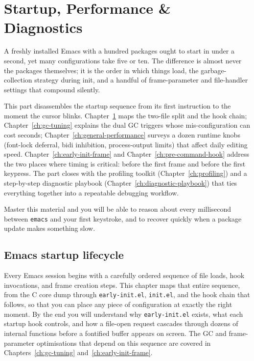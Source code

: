 \part{Startup, Performance \& Diagnostics}
\label{part:startup}

A freshly installed Emacs with a hundred packages ought to start in
under a second, yet many configurations take five or ten.  The
difference is almost never the packages themselves; it is the order
in which things load, the garbage-collection strategy during init,
and a handful of frame-parameter and file-handler settings that
compound silently.

This part disassembles the startup sequence from its first
instruction to the moment the cursor blinks.
Chapter~\ref{ch:startup-lifecycle} maps the two-file split and the
hook chain; Chapter~\ref{ch:gc-tuning} explains the dual GC triggers
whose mis-configuration can cost seconds;
Chapter~\ref{ch:general-performance} surveys a dozen runtime knobs
(font-lock deferral, bidi inhibition, process-output limits) that
affect daily editing speed.
Chapter~\ref{ch:early-init-frame} and
Chapter~\ref{ch:pre-command-hook} address the two places where timing
is critical: before the first frame and before the first keypress.
The part closes with the profiling toolkit
(Chapter~\ref{ch:profiling}) and a step-by-step diagnostic playbook
(Chapter~\ref{ch:diagnostic-playbook}) that ties everything together
into a repeatable debugging workflow.

Master this material and you will be able to reason about every
millisecond between \texttt{emacs} and your first keystroke, and to
recover quickly when a package update makes something slow.

\chapter{Emacs startup lifecycle}
\label{ch:startup-lifecycle}
\minitoc\label{emacs-startup-lifecycle}

Every Emacs session begins with a carefully ordered sequence of file
loads, hook invocations, and frame creation steps.  This chapter maps
that entire sequence, from the C core dump through
\texttt{early-init.el}, \texttt{init.el}, and the hook chain that
follows, so that you can place any piece of configuration at exactly
the right moment.  By the end you will understand why
\texttt{early-init.el} exists, what each startup hook controls, and
how a file-open request cascades through dozens of internal functions
before a fontified buffer appears on screen.  The GC and
frame-parameter optimisations that depend on this sequence are
covered in Chapters~\ref{ch:gc-tuning}
and~\ref{ch:early-init-frame}.

